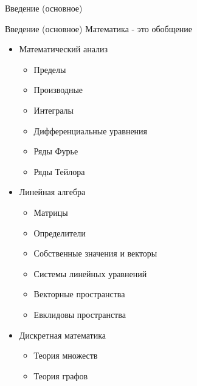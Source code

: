 \documentclass{beamer}
\begin{document}
\begin{section}{Введение (основное)}
\begin{frame}{Введение (основное)}
    Математика - это обобщение
    \begin{itemize}
        \item Математический анализ 
            \begin{itemize}
                \item Пределы
                \item Производные
                \item Интегралы
                \item Дифференциальные уравнения
                \item Ряды Фурье
                \item Ряды Тейлора
            \end{itemize}
        \item Линейная алгебра 
            \begin{itemize}
                \item Матрицы
                \item Определители
                \item Собственные значения и векторы
                \item Системы линейных уравнений
                \item Векторные пространства
                \item Евклидовы пространства
            \end{itemize}
        \item Дискретная математика 
            \begin{itemize}
                \item Теория множеств
                \item Теория графов
            \end{itemize}
    \end{itemize}
\end{frame}


\end{section}
\end{document}
